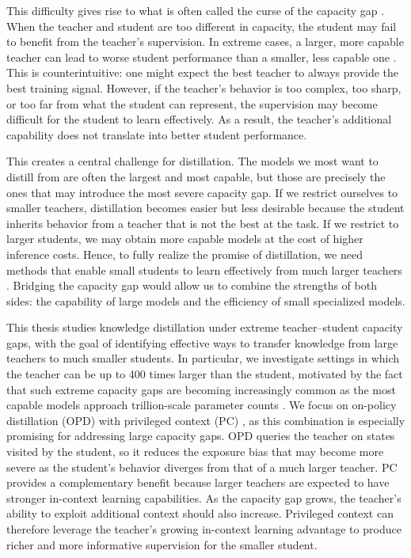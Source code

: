 This difficulty gives rise to what is often called the curse of the capacity gap \cite{zhangLiftingCurseCapacity2023}. When the teacher and student are too different in capacity, the student may fail to benefit from the teacher’s supervision. In extreme cases, a larger, more capable teacher can lead to worse student performance than a smaller, less capable one \cite{mirzadehImprovedKnowledgeDistillation2019, liSmallModelsStruggle2025}. This is counterintuitive: one might expect the best teacher to always provide the best training signal. However, if the teacher’s behavior is too complex, too sharp, or too far from what the student can represent, the supervision may become difficult for the student to learn effectively. As a result, the teacher’s additional capability does not translate into better student performance.

This creates a central challenge for distillation. The models we most want to distill from are often the largest and most capable, but those are precisely the ones that may introduce the most severe capacity gap. If we restrict ourselves to smaller teachers, distillation becomes easier but less desirable because the student inherits behavior from a teacher that is not the best at the task. If we restrict to larger students, we may obtain more capable models at the cost of higher inference costs. Hence, to fully realize the promise of distillation, we need methods that enable small students to learn effectively from much larger teachers \cite{shi2021FollowYourPath, shingTAIDTemporallyAdaptive2025, jang2026StableOnPolicyDistillation}. Bridging the capacity gap would allow us to combine the strengths of both sides: the capability of large models and the efficiency of small specialized models.

This thesis studies knowledge distillation under extreme teacher–student capacity gaps, with the goal of identifying effective ways to transfer knowledge from large teachers to much smaller students. In particular, we investigate settings in which the teacher can be up to 400 times larger than the student, motivated by the fact that such extreme capacity gaps are becoming increasingly common as the most capable models approach trillion-scale parameter counts \cite{team2026KimiK2Open, deepseekai2026deepseekv4, glm-5-team2026GLM5VibeCoding}. We focus on on-policy distillation (OPD) \cite{agarwalOnPolicyDistillationLanguage2024, guMiniLLMOnPolicyDistillation2026, luOnPolicyDistillation2025} with privileged context (PC) \cite{penalozaPrivilegedInformationDistillation2026, zhaoSelfDistilledReasonerOnPolicy2026, shenfeldSelfDistillationEnablesContinual2026}, as this combination is especially promising for addressing large capacity gaps. OPD queries the teacher on states visited by the student, so it reduces the exposure bias that may become more severe as the student’s behavior diverges from that of a much larger teacher. PC provides a complementary benefit because larger teachers are expected to have stronger in-context learning capabilities. As the capacity gap grows, the teacher’s ability to exploit additional context should also increase. Privileged context can therefore leverage the teacher’s growing in-context learning advantage to produce richer and more informative supervision for the smaller student.

